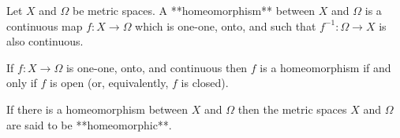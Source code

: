 Let \(X\) and \(\Omega\) be metric spaces. A **homeomorphism** between \(X\) and \(\Omega\) is a continuous map \(f: X \to \Omega\) which is one-one, onto, and such that \(f^{-1}: \Omega \to X\) is also continuous.

If \(f: X \to \Omega\) is one-one, onto, and continuous then \(f\) is a homeomorphism if and only if \(f\) is open (or, equivalently, \(f\) is closed).

If there is a homeomorphism between \(X\) and \(\Omega\) then the metric spaces \(X\) and \(\Omega\) are said to be **homeomorphic**.
